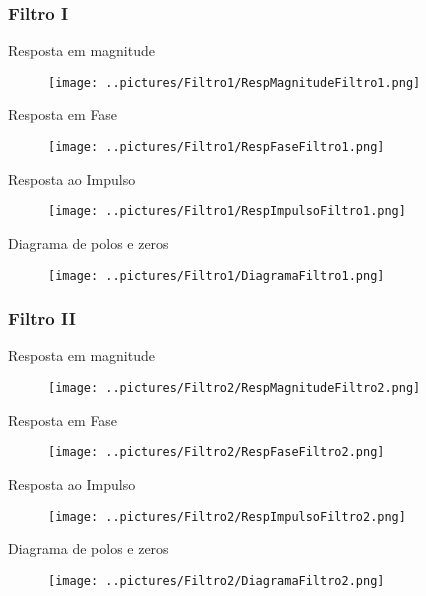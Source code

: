 \documentclass{beamer}
\begin{document}
\subsubsection{Filtro I}
	\begin{frame}{Resposta em magnitude}
		\begin{figure}[ht]
			\centering
			\texttt{[image: ..pictures/Filtro1/RespMagnitudeFiltro1.png]}
			\label{fig:magnitude1}
		\end{figure}
	\end{frame}
	\begin{frame}{Resposta em Fase}
		\begin{figure}[ht]
			\centering
			\texttt{[image: ..pictures/Filtro1/RespFaseFiltro1.png]}
			\label{fig:magnitude1}
		\end{figure}
	\end{frame}
	\begin{frame}{Resposta ao Impulso}
		\begin{figure}[ht]
			\centering
			\texttt{[image: ..pictures/Filtro1/RespImpulsoFiltro1.png]}
			\label{fig:magnitude1}
		\end{figure}
	\end{frame}
	\begin{frame}{Diagrama de polos e zeros}
		\begin{figure}[ht]
			\centering
			\texttt{[image: ..pictures/Filtro1/DiagramaFiltro1.png]}
			\label{fig:magnitude1}
		\end{figure}
	\end{frame}

\subsubsection{Filtro II}
	\begin{frame}{Resposta em magnitude}
		\begin{figure}[ht]
			\centering
			\texttt{[image: ..pictures/Filtro2/RespMagnitudeFiltro2.png]}
			\label{fig:magnitude1}
		\end{figure}
	\end{frame}
	\begin{frame}{Resposta em Fase}
		\begin{figure}[ht]
			\centering
			\texttt{[image: ..pictures/Filtro2/RespFaseFiltro2.png]}
			\label{fig:magnitude1}
		\end{figure}
	\end{frame}
	\begin{frame}{Resposta ao Impulso}
		\begin{figure}[ht]
			\centering
			\texttt{[image: ..pictures/Filtro2/RespImpulsoFiltro2.png]}
			\label{fig:magnitude1}
		\end{figure}
	\end{frame}
	\begin{frame}{Diagrama de polos e zeros}
		\begin{figure}[ht]
			\centering
			\texttt{[image: ..pictures/Filtro2/DiagramaFiltro2.png]}
			\label{fig:magnitude1}
		\end{figure}
	\end{frame}
	
\end{document}
